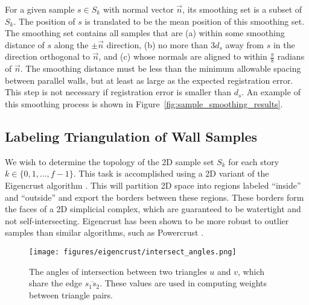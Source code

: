 \documentclass[10pt,twocolumn,letterpaper]{article}
\begin{document}
For a given sample $s \in S_k$ with normal vector $\vec{n}$, its smoothing set is a subset of $S_k$.  The position of $s$ is translated to be the mean position of this smoothing set. The smoothing set contains all samples that are (a) within some smoothing distance of $s$ along the $\pm \vec{n}$ direction, (b) no more than $3 d_s$ away from $s$ in the direction orthogonal to $\vec{n}$, and (c) whose normals are aligned to within $\frac{\pi}{8}$ radians of $\vec{n}$.  The smoothing distance must be less than the minimum allowable spacing between parallel walls, but at least as large as the expected registration error.  This step is not necessary if registration error is smaller than $d_s$.  An example of this smoothing process is shown in Figure~\ref{fig:sample_smoothing_results}.

\subsection{Labeling Triangulation of Wall Samples}
\label{sec:triangulation}

We wish to determine the topology of the 2D sample set $S_k$ for each story $k \in \{ 0, 1, ..., f-1 \}$.  This task is accomplished using a 2D variant of the Eigencrust algorithm \cite{Eigencrust}.  This will partition 2D space into regions labeled ``inside'' and ``outside'' and export the borders between these regions.  These borders form the faces of a 2D simplicial complex, which are guaranteed to be watertight and not self-intersecting.  Eigencrust has been shown to be more robust to outlier samples than similar algorithms, such as Powercrust \cite{Eigencrust, Powercrust}.

\begin{figure}[t]

\begin{minipage}[b]{1.0\linewidth}
  \centering
  \centerline{\texttt{[image: figures/eigencrust/intersect\_angles.png]}}
\end{minipage}

\caption{The angles of intersection between two triangles $u$ and $v$, which share the edge $\overline{s_1 s_2}$. These values are used in computing weights between triangle pairs.}
\label{fig:intersect_angles}

\end{figure}

\end{document}
